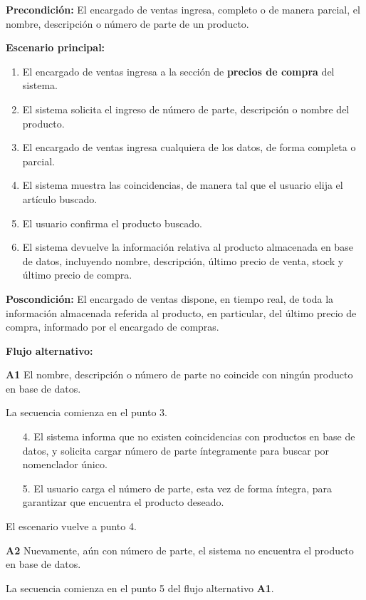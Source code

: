 \textbf{Precondición:} 
El encargado de ventas ingresa, completo o de manera parcial, el nombre, descripción o número de parte de un producto.

\textbf{Escenario principal:}
\begin{enumerate}
	\item El encargado de ventas ingresa a la sección de \textbf{precios de compra} del sistema.
	\item El sistema solicita el ingreso de número de parte, descripción o nombre del producto.
	\item El encargado de ventas ingresa cualquiera de los datos, de forma completa o parcial.
	\item El sistema muestra las coincidencias, de manera tal que el usuario elija el artículo buscado.
	\item El usuario confirma el producto buscado.
	\item El sistema devuelve la información relativa al producto almacenada en base de datos,
	incluyendo nombre, descripción, último precio de venta, stock y último precio de compra.
\end{enumerate}

\textbf{Poscondición:}
El encargado de ventas dispone, en tiempo real,
de toda la información almacenada referida al producto,
en particular,
del último precio de compra,
informado por el encargado de compras.

\textbf{Flujo alternativo:}

\textbf{A1} El nombre, descripción o número de parte no coincide con ningún producto en base de datos.

La secuencia comienza en el punto 3.

\begin{enumerate}
	\item[4.] El sistema informa que no existen coincidencias con productos en base de datos,
	y solicita cargar número de parte íntegramente para buscar por nomenclador único.
	\item[5.] El usuario carga el número de parte, esta vez de forma íntegra,
	para garantizar que encuentra el producto deseado.
\end{enumerate}

El escenario vuelve a punto 4.

\textbf{A2} Nuevamente, aún con número de parte, el sistema no encuentra el producto en base de datos.

La secuencia comienza en el punto 5 del flujo alternativo \textbf{A1}.

